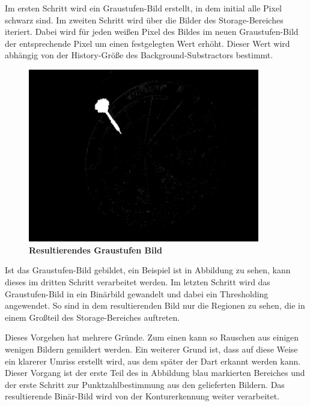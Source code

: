 Im ersten Schritt wird ein Graustufen-Bild erstellt, in dem initial alle Pixel schwarz sind. 
Im zweiten Schritt wird über die Bilder des Storage-Bereiches iteriert. Dabei wird für jeden weißen Pixel des Bildes im neuen Graustufen-Bild der entsprechende Pixel um einen festgelegten Wert erhöht. Dieser Wert wird abhängig von der History-Größe des Background-Substractors bestimmt.
\begin{figure}[ht]
\centering
\includegraphics[width=0.9\textwidth]{media/blobimg}
\caption{\textbf{Resultierendes Graustufen Bild}}
\label{Fig:greyimg}
\end{figure}
Ist das Graustufen-Bild gebildet, ein Beispiel ist in Abbildung  zu sehen, kann dieses im dritten Schritt verarbeitet werden. 
Im letzten Schritt wird das Graustufen-Bild in ein Binärbild gewandelt und dabei ein Thresholding angewendet. So sind in dem resultierenden Bild nur die Regionen zu sehen, die in einem Großteil des Storage-Bereiches auftreten. 

Dieses Vorgehen hat mehrere Gründe. 
Zum einen kann so Rauschen aus einigen wenigen Bildern gemildert werden. 
Ein weiterer Grund ist, dass auf diese Weise ein klarerer Umriss erstellt wird, aus dem später der Dart erkannt werden kann. 
Dieser Vorgang ist der erste Teil des in Abbildung  blau markierten Bereiches und der erste Schritt zur Punktzahlbestimmung aus den gelieferten Bildern. Das resultierende Binär-Bild wird von der Konturerkennung weiter verarbeitet.

